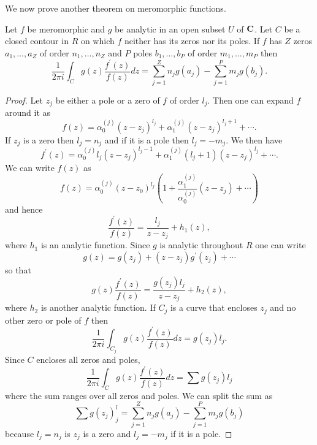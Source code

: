 We now prove another theorem on meromorphic functions.
\begin{thm}\label{c5s5t2}
Let $f$ be meromorphic and $g$ be analytic in an open subset $U$ of $\mathbf{C}$. Let
$C$ be a closed contour in $R$ on which $f$ neither has its zeros nor its poles.
If $f$ has $Z$ zeros $a_1, \ldots, a_Z$ of order $n_1, \ldots, n_Z$ and $P$ 
poles $b_1, \ldots, b_P$ of order $m_1, \ldots, m_P$ then
\[
\frac{1}{2\pi i}\int_C g(z)\frac{f^\prime(z)}{f(z)}dz = 
\sum_{j=1}^Z n_jg(a_j) - \sum_{j=1}^Pm_j g(b_j).
\]
\end{thm}
\begin{proof}
Let $z_j$ be either a pole or a zero of $f$ of order $l_j$. Then one can 
expand $f$ around it as 
\[
f(z) = \alpha_0^{(j)}(z - z_j)^{l_j} + \alpha_1^{(j)}(z - z_j)^{l_j+1} + 
\cdots.
\]
If $z_j$ is a zero then $l_j = n_j$ and if it is a pole then $l_j = -m_j$.
We then have
\[
f^\prime(z) = \alpha_0^{(j)}l_j(z - z_j)^{l_j-1} + \alpha_1^{(j)}(l_j+1)
(z - z_j)^{l_j} + \cdots.
\]
We can write $f(z)$ as
\[
f(z) = \alpha_0^{(j)}(z-z_0)^{l_j}\left(1 + \frac{\alpha_1^{(j)}}{\alpha_0^{(j)}}
(z - z_j) + \cdots \right)
\]
and hence
\[
\frac{f^\prime(z)}{f(z)} = \frac{l_j}{z - z_j} + h_1(z),
\]
where $h_1$ is an analytic function. Since $g$ is analytic throughout $R$ one
can write 
\[
g(z) = g(z_j) + (z - z_j)g^\prime(z_j) + \cdots
\]
so that
\[
g(z)\frac{f^\prime(z)}{f(z)} = \frac{g(z_j)l_j}{z - z_j} + h_2(z),
\]
where $h_2$ is another analytic function. If $C_j$ is a curve that encloses
$z_j$ and no other zero or pole of $f$ then
\[
\frac{1}{2\pi i}\int_{C_j}g(z)\frac{f^\prime(z)}{f(z)}dz = g(z_j)l_j.
\]
Since $C$ encloses all zeros and poles,
\[
\frac{1}{2\pi i}\int_{C}g(z)\frac{f^\prime(z)}{f(z)}dz = \sum g(z_j)l_j
\]
where the sum ranges over all zeros and poles. We can split the sum as
\[
\sum g(z_j)^l_j = \sum_{j=1}^Z n_jg(a_j) - \sum_{j=1}^P m_jg(b_j)
\]
because $l_j = n_j$ is $z_j$ is a zero and $l_j = -m_j$ if it is a pole.
\end{proof}

